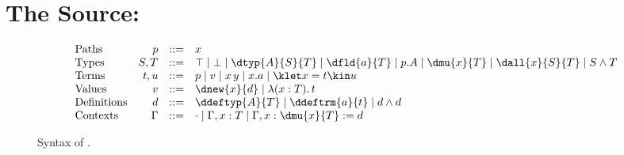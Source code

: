 \section{The Source: \DOTMNF}\label{sec:source}

\begin{figure}
\small
\[
\begin{array}{@{}lrcl@{}}
\text{Paths} & p & ::= & x \\
\text{Types} & S,T & ::= & \top \mid \bot \mid \dtyp{A}{S}{T} \mid \dfld{a}{T} \mid p.A \mid \dmu{x}{T} \mid \dall{x}{S}{T} \mid S \wedge T \\
\text{Terms} & t,u & ::= & p \mid v \mid x\,y \mid x.a \mid \klet x = t \kin u \\
\text{Values} & v & ::= & \dnew{x}{d} \mid \lambda(x : T).\,t \\
\text{Definitions} & d & ::= & \ddeftyp{A}{T} \mid \ddeftrm{a}{t} \mid d \wedge d \\
\text{Contexts} & \Gamma & ::= & \cdot \mid \Gamma, x : T \mid \Gamma, x : \dmu{x}{T} \mathrel{:=} d
\end{array}
\]
\caption{Syntax of \DOTMNF.}
\label{fig:source-syntax}
\end{figure}

